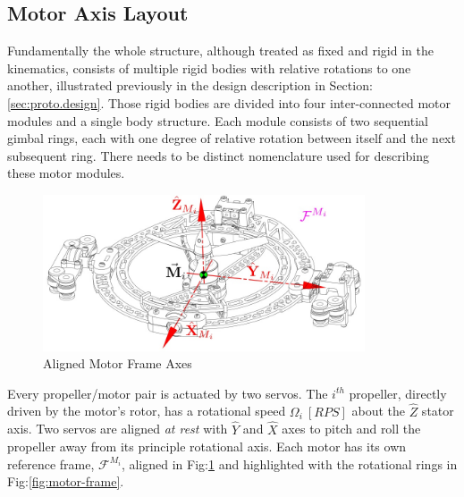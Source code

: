 \subsection{Motor Axis Layout}
\label{subsec:proto.conventions.motoraxis}
Fundamentally the whole structure, although treated as fixed and rigid in the kinematics, consists of multiple rigid bodies with relative rotations to one another, illustrated previously in the design description in Section:\ref{sec:proto.design}. Those rigid bodies are divided into four inter-connected motor modules and a single body structure. Each module consists of two sequential gimbal rings, each with one degree of relative rotation between itself and the next subsequent ring. There needs to be distinct nomenclature used for describing these motor modules. 
\begin{figure}[htbp]
\centering
\includegraphics[width=0.85\textwidth]{figs/motor-axes}
\caption{Aligned Motor Frame Axes}
\label{fig:motor-axes}
\end{figure}
\par
Every propeller/motor pair is actuated by two servos. The $i^{th}$ propeller, directly driven by the motor's rotor, has a rotational speed $\Omega_i~[RPS]$ about the $\hat{Z}$ stator axis. Two servos are aligned \emph{at rest} with $\hat{Y}$ and $\hat{X}$ axes to pitch and roll the propeller away from its principle rotational axis. Each motor has its own reference frame, $\mathcal{F}^{M_i}$, aligned in Fig:\ref{fig:motor-axes} and highlighted with the rotational rings in Fig:\ref{fig:motor-frame}.
\par
